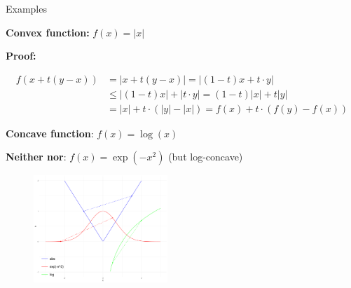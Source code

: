 \documentclass[11pt,compress,t,notes=noshow, xcolor=table]{beamer}
\begin{document}
\begin{vbframe}{Examples}

\textbf{Convex function:} $f(x) = |x|$

\begin{footnotesize}
    \textbf{Proof:}

    \vspace*{-0.75cm}

    \begin{align*}
        f\left(x + t(y - x)\right) &= |x + t(y - x)| = |(1 - t) x + t \cdot y| \\
        & \le |(1 - t) x| + |t \cdot y| = (1 - t) |x| + t |y| \\
        &= |x| + t \cdot (|y| - |x|) = f(x) + t \cdot (f(y) - f(x))
    \end{align*}
\end{footnotesize}

\textbf{Concave function}: $f(x) = \log(x)$

\vspace*{0.2cm}

\textbf{Neither nor}: $f(x) = \exp(-x^2)$ (but log-concave)

\begin{figure}
    \centering
    \includegraphics[width=0.45\textwidth]{figure_man/conv_conc_functions.png}
\end{figure}

\end{vbframe}
\end{document}
